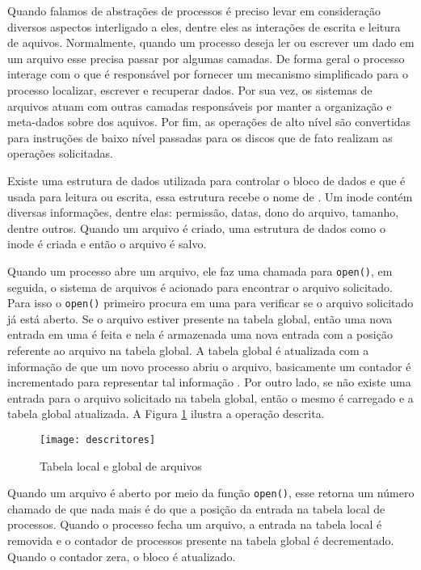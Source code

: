 Quando falamos de abstrações de processos é preciso levar em consideração
diversos aspectos interligado a eles, dentre eles as interações de escrita e
leitura de aquivos. Normalmente, quando um processo deseja ler ou escrever um
dado em um arquivo esse precisa passar por algumas camadas. De forma geral o
processo interage com o  que é responsável
por fornecer um mecanismo simplificado para o processo localizar, escrever e
recuperar dados. Por sua vez, os sistemas de arquivos atuam com outras camadas
responsáveis por manter a organização e meta-dados sobre dos aquivos. Por fim,
as operações de alto nível são convertidas para instruções de baixo nível
passadas para os discos que de fato realizam as operações solicitadas.

Existe uma estrutura de dados utilizada para controlar o bloco de dados e que é
usada para leitura ou escrita, essa estrutura recebe o nome de
. Um inode contém diversas informações, dentre elas:
permissão, datas, dono do arquivo, tamanho, dentre outros. Quando um arquivo é
criado, uma estrutura de dados como o inode é criada e então o arquivo é salvo.

Quando um processo abre um arquivo, ele faz uma chamada para \texttt{open()}, em
seguida, o sistema de arquivos é acionado para encontrar o arquivo solicitado.
Para isso o \texttt{open()} primeiro procura em uma  para verificar se o arquivo solicitado já está aberto. Se o
arquivo estiver presente na tabela global, então uma nova entrada em uma
 é feita e nela é
armazenada uma nova entrada com a posição referente ao arquivo na tabela
global. A tabela global é atualizada com a informação de que um novo processo
abriu o arquivo, basicamente um contador é incrementado para representar tal
informação . Por outro lado, se não existe uma entrada para o arquivo
solicitado na tabela global, então o mesmo é carregado e a tabela global
atualizada. A Figura \ref{fig:descritores} ilustra a operação descrita.
 
\begin{figure}[!h]
  \centering
  \texttt{[image: descritores]} 
  \caption{Tabela local e global de arquivos}
  \label{fig:descritores} 
\end{figure}

Quando um arquivo é aberto por meio da função \texttt{open()}, esse retorna um
número chamado de 
que nada mais é do que a posição da entrada na tabela local de processos.
Quando o processo fecha um arquivo, a entrada na tabela local é removida e o
contador de processos presente na tabela global é decrementado. Quando o
contador zera, o bloco é atualizado.

